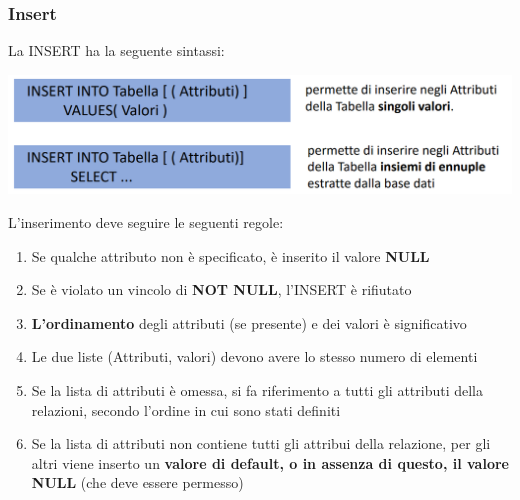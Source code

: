 \documentclass[12pt]{article}
\begin{document}
\subsubsection{Insert}
La INSERT ha la seguente sintassi:
\begin{center}
    \includegraphics[width = 1\textwidth]{Images/204.PNG}
\end{center}
L'inserimento deve seguire le seguenti regole:
\begin{enumerate}
    \item Se qualche attributo non è specificato, è inserito il valore \textbf{NULL}
    \item Se è violato un vincolo di \textbf{NOT NULL}, l'INSERT è rifiutato
    \item \textbf{L'ordinamento} degli attributi (se presente) e dei valori è significativo
    \item Le due liste (Attributi, valori) devono avere lo stesso numero di elementi
    \item Se la lista di attributi è omessa, si fa riferimento a tutti gli attributi della relazioni, secondo l'ordine in cui sono stati definiti
    \item Se la lista di attributi non contiene tutti gli attribui della relazione, per gli altri viene inserto un \textbf{valore di default, o in assenza di questo, il valore NULL} (che deve essere permesso)
\end{enumerate}
\end{document}
